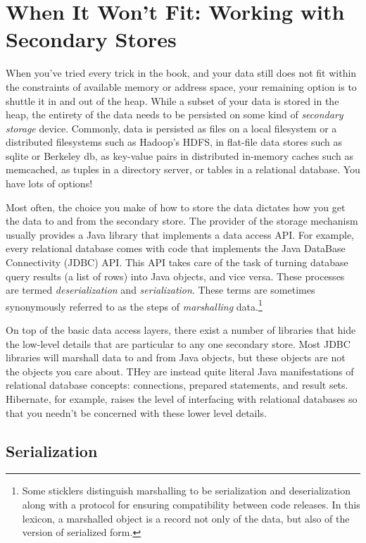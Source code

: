 \chapter{When It Won't Fit: Working with Secondary Stores}

When you've tried every trick in the book, and your data still does not fit
within the constraints of available memory or address space, your remaining
option is to shuttle it in and out of the heap. While a subset of your data is
stored in the heap, the entirety of the data needs to be persisted on some kind
of \emph{secondary storage} device. Commonly, data is persisted as files on a
local filesystem or a distributed filesystems such as Hadoop's HDFS, in
flat-file data stores such as sqlite or Berkeley db, as key-value pairs in
distributed in-memory caches such as memcached, as tuples in a directory server,
or tables in a relational database. You have lots of options!

Most often, the choice you make of how to store the data dictates how you get
the data to and from the secondary store. The provider of the storage mechanism
usually provides a Java library that implements a data access API. For example,
every relational database comes with code that implements the Java DataBase
Connectivity (JDBC) API. This API takes care of the task of turning database
query results (a list of rows) into Java objects, and vice versa. These
processes are termed \emph{deserialization} and
\emph{serialization}. These terms are sometimes
synonymously referred to as the steps of \emph{marshalling} data.\footnote{Some
sticklers distinguish marshalling to be serialization and deserialization along
with a protocol for ensuring compatibility between code releases. In this
lexicon, a marshalled object is a record not only of the data, but also of the
version of serialized form.}

On top of the basic data access layers, there exist a number of libraries that
hide the low-level details that are particular to any one secondary store. Most
JDBC libraries will marshall data to and from Java objects, but these objects
are not the objects you care about. THey are instead quite literal Java
manifestations of relational database concepts: connections, prepared
statements, and result sets. Hibernate, for example, raises the level of
interfacing with relational databases so that you needn't be concerned with
these lower level details.



\section{Serialization}

